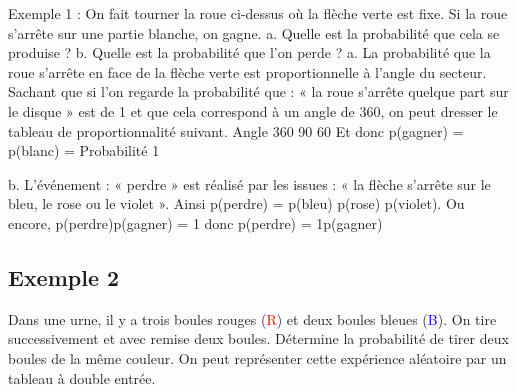 Exemple 1 : On fait tourner la roue ci-dessus où la flèche verte est fixe. 
Si la roue s'arrête sur une partie blanche, on gagne. 
a. Quelle est la probabilité que cela se produise ?
b. Quelle est la probabilité que l'on perde ?
a. La probabilité que la roue s'arrête en face de la flèche verte est proportionnelle à l'angle du secteur. Sachant que si l'on regarde la probabilité que : « la roue s'arrête quelque part sur le disque » est de 1 et que cela correspond à un angle de 360\degres, on peut dresser le tableau de proportionnalité suivant.
Angle
360
90
60
Et donc p(gagner) = p(blanc) =
Probabilité
1



b. L'événement : « perdre » est réalisé par les issues : « la flèche s'arrête sur le bleu, le rose ou le violet ». 
Ainsi p(perdre) = p(bleu)  p(rose)  p(violet). 
Ou encore, p(perdre)p(gagner) = 1 donc p(perdre) = 1p(gagner)



	\subsection{Exemple 2}
	
Dans une urne, il y a trois boules rouges (\textcolor{red}{R}) et deux boules bleues (\textcolor{blue}{B}). On tire successivement et avec remise deux boules. Détermine la probabilité de tirer deux boules de la même couleur.
On peut représenter cette expérience aléatoire par un tableau à double entrée.


